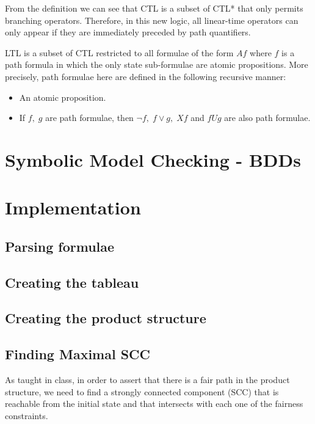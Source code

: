 \documentclass[11pt]{article}
\begin{document}
    From the definition we can see that CTL is a subset of CTL* that only permits
    branching operators. Therefore, in this new logic, all linear-time operators
    can only appear if they are immediately preceded by path quantifiers.

    \begin{definition}
        LTL is a subset of CTL restricted to all formulae of the form $Af$ where
        $f$ is a path formula in which the only state sub-formulae are atomic
        propositions\cite{ltl}.
        More precisely, path formulae here are defined in the following recursive
        manner:
        \begin{itemize}
            \item
                An atomic proposition.
            \item
                If $f,\; g$ are path formulae, then $\neg f,\; f\vee g,\;
                Xf$ and $fUg$ are also path formulae.
        \end{itemize}
    \end{definition}


\section{Symbolic Model Checking - BDDs}

\section{Implementation}
    \subsection{Parsing formulae}
    \subsection{Creating the tableau}
    \subsection{Creating the product structure}
    \subsection{Finding Maximal SCC}
        As taught in class, in order to assert that there is a fair path in the 
        product structure, we need to find a strongly connected component (SCC)
        that is reachable from the initial state and that intersects with
        each one of the fairness constraints.
        
\end{document}
